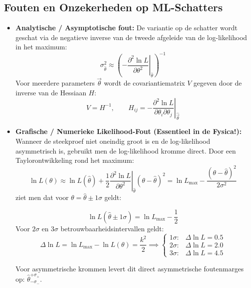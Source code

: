 \documentclass[11pt,a4paper]{article}
\begin{document}
\subsection{Fouten en Onzekerheden op ML-Schatters}
\begin{itemize}[leftmargin=1.5em]
    \item \textbf{Analytische / Asymptotische fout:}
    De variantie op de schatter wordt geschat via de negatieve inverse van de tweede afgeleide van de log-likelihood in het maximum:
    \begin{equation}
        \sigma_{\hat{\theta}}^2 \approx \left( -\left. \frac{\partial^2 \ln L}{\partial \theta^2} \right|_{\hat{\theta}} \right)^{-1}
    \end{equation}
    Voor meerdere parameters $\vec{\theta}$ wordt de covariantiematrix $V$ gegeven door de inverse van de Hessiaan $H$:
    \begin{equation}
        V = H^{-1}, \qquad H_{ij} = -\left. \frac{\partial^2 \ln L}{\partial \theta_i \partial \theta_j} \right|_{\hat{\vec{\theta}}}
    \end{equation}
    \item \textbf{Grafische / Numerieke Likelihood-Fout (Essentieel in de Fysica!):}
    Wanneer de steekproef niet oneindig groot is en de log-likelihood asymmetrisch is, gebruikt men de log-likelihood kromme direct. Door een Taylorontwikkeling rond het maximum:
    \begin{equation}
        \ln L(\theta) \approx \ln L(\hat{\theta}) + \frac{1}{2} \left. \frac{\partial^2 \ln L}{\partial \theta^2} \right|_{\hat{\theta}} (\theta - \hat{\theta})^2 = \ln L_{\max} - \frac{(\theta - \hat{\theta})^2}{2\sigma^2}
    \end{equation}
    ziet men dat voor $\theta = \hat{\theta} \pm 1\sigma$ geldt:
    \begin{formulabox}
    \begin{equation}
        \ln L(\hat{\theta} \pm 1\sigma) = \ln L_{\max} - \frac{1}{2}
    \end{equation}
    Voor $2\sigma$ en $3\sigma$ betrouwbaarheidsintervallen geldt:
    \begin{equation}
        \Delta \ln L = \ln L_{\max} - \ln L(\theta) = \frac{k^2}{2} \implies \begin{cases}
            1\sigma: & \Delta \ln L = 0.5 \\
            2\sigma: & \Delta \ln L = 2.0 \\
            3\sigma: & \Delta \ln L = 4.5
        \end{cases}
    \end{equation}
    \end{formulabox}
    Voor asymmetrische krommen levert dit direct asymmetrische foutenmarges op: $\hat{\theta}_{-\sigma_-}^{+\sigma_+}$.
\end{itemize}
\end{document}
